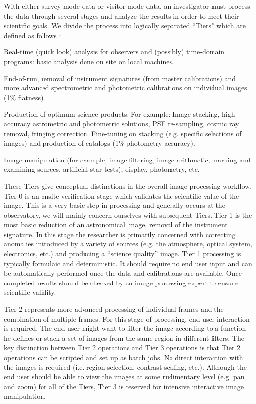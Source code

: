 \documentclass[10pt,conference]{IEEEtran}
\begin{document}
With either survey mode data or visitor mode data, an investigator must process the data through several stages and analyze the results in order to meet their scientific goals. We divide the process into logically separated ``Tiers'' which are defined as follows \cite{PASRD}:
\begin{description} 
\item[\bf Tier 0] Real-time (quick look) analysis for observers and (possibly) time-domain
programs: basic analysis done on site on local machines. 
\item[\bf Tier 1] End-of-run, removal of instrument signatures (from master calibrations) and more
advanced spectrometric and photometric calibrations on individual images (1\% flatness).
\item[\bf Tier 2] Production of optimum science products. For example: Image stacking, high
accuracy astrometric and photometric solutions, PSF re-sampling, cosmic ray removal,
fringing correction. Fine-tuning on stacking (e.g. specific selections of images) and
production of catalogs (1\% photometry accuracy).
\item[\bf Tier 3] Image manipulation (for example, image filtering, image arithmetic, marking and
examining sources, artificial star tests), display, photometry, etc.
\end{description}

These Tiers give conceptual distinctions in the overall image processing workflow. Tier 0 is an onsite verification stage which validates the scientific value of the image. This is a very basic step in processing and generally occurs at the observatory, we will mainly concern ourselves with subsequent Tiers. Tier 1 is the most basic reduction of an astronomical image, removal of the instrument signature. In this stage the researcher is primarily concerned with correcting anomalies introduced by a variety of sources (e.g. the atmosphere, optical system, electronics, etc.) and producing a ``science quality'' image. Tier 1 processing is typically formulaic and deterministic. It should require no end user input and can be automatically performed once the data and calibrations are available. Once completed results should be checked by an image processing expert to ensure scientific validity.

 Tier 2 represents more advanced processing of individual frames and the combination of multiple frames. For this stage of processing, end user interaction is required. The end user might want to filter the image according to a function he defines or stack a set of images from the same region in different filters. The key distinction between Tier 2 operations and Tier 3 operations is that Tier 2 operations can be scripted and set up as batch jobs. No direct interaction with the images is required (i.e. region selection, contrast scaling, etc.). Although the end user should be able to view the images at some rudimentary level (e.g. pan and zoom) for all of the Tiers, Tier 3 is reserved for intensive interactive image manipulation.
\end{document}
